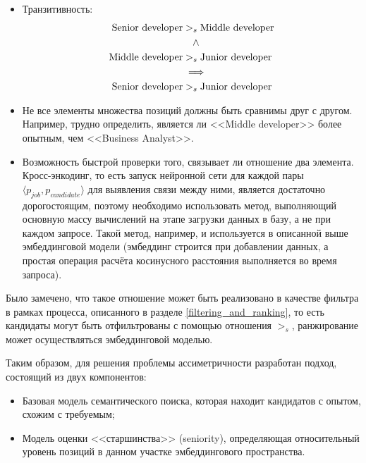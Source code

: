 \documentclass[14pt]{mmcs_article}
\begin{document}
\begin{itemize}
  \item Транзитивность: \\
        \begin{equation*}
          \centering
          \allowdisplaybreaks[1]
          \begin{split}
            \text{Senior developer} & >_{s} \text{Middle developer} \\
                                    & ~~~\land                      \\
            \text{Middle developer} & >_{s} \text{Junior developer} \\
                                    & \implies                      \\
            \text{Senior developer} & >_{s} \text{Junior developer}
          \end{split}
        \end{equation*}
  \item Не все элементы множества позиций должны быть сравнимы друг с другом. Например, трудно определить, является ли <<Middle developer>> более опытным, чем <<Business Analyst>>.
  \item Возможность быстрой проверки того, связывает ли отношение два элемента. Кросс-энкодинг, то есть запуск нейронной сети для каждой пары $\langle p_{job}, p_{candidate} \rangle$ для выявления связи между ними, является достаточно дорогостоящим, поэтому необходимо использовать метод, выполняющий основную массу вычислений на этапе загрузки данных в базу, а не при каждом запросе. Такой метод, например, и используется в описанной выше эмбеддинговой модели (эмбеддинг строится при добавлении данных, а простая операция расчёта косинусного расстояния выполняется во время запроса).
\end{itemize}

Было замечено, что такое отношение может быть реализовано в качестве фильтра в рамках процесса, описанного в разделе \ref{filtering_and_ranking}, то есть кандидаты могут быть отфильтрованы с помощью отношения $>_{s}$, ранжирование может осуществляться эмбеддинговой моделью.

Таким образом, для решения проблемы ассиметричности разработан подход, состоящий из двух компонентов:

\begin{itemize}
  \item Базовая модель семантического поиска, которая находит кандидатов с опытом, схожим с требуемым;
  \item Модель оценки <<старшинства>> (seniority), определяющая относительный уровень позиций в данном участке эмбеддингового пространства.
\end{itemize}
\end{document}
